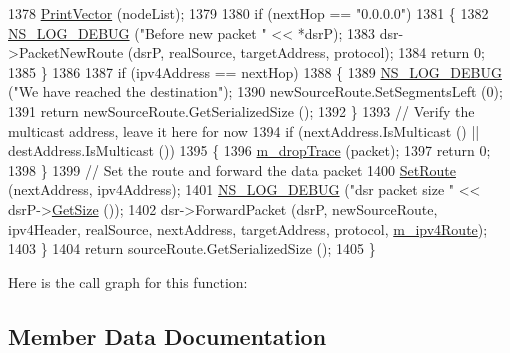 \begin{DoxyCode}
1378       \hyperlink{classns3_1_1dsr_1_1DsrOptions_a44ae8e58769880ec9c0150bb28652350}{PrintVector} (nodeList);
1379 
1380       \textcolor{keywordflow}{if} (nextHop == \textcolor{stringliteral}{"0.0.0.0"})
1381         \{
1382           \hyperlink{group__logging_ga413f1886406d49f59a6a0a89b77b4d0a}{NS\_LOG\_DEBUG} (\textcolor{stringliteral}{"Before new packet "} << *dsrP);
1383           dsr->PacketNewRoute (dsrP, realSource, targetAddress, protocol);
1384           \textcolor{keywordflow}{return} 0;
1385         \}
1386 
1387       \textcolor{keywordflow}{if} (ipv4Address == nextHop)
1388         \{
1389           \hyperlink{group__logging_ga413f1886406d49f59a6a0a89b77b4d0a}{NS\_LOG\_DEBUG} (\textcolor{stringliteral}{"We have reached the destination"});
1390           newSourceRoute.SetSegmentsLeft (0);
1391           \textcolor{keywordflow}{return} newSourceRoute.GetSerializedSize ();
1392         \}
1393       \textcolor{comment}{// Verify the multicast address, leave it here for now}
1394       \textcolor{keywordflow}{if} (nextAddress.IsMulticast () || destAddress.IsMulticast ())
1395         \{
1396           \hyperlink{classns3_1_1dsr_1_1DsrOptions_a176bbc9efb58b6d750c14b9b03c525c4}{m\_dropTrace} (packet);
1397           \textcolor{keywordflow}{return} 0;
1398         \}
1399       \textcolor{comment}{// Set the route and forward the data packet}
1400       \hyperlink{classns3_1_1dsr_1_1DsrOptions_af749b76db4626ae64bc37001a5353b99}{SetRoute} (nextAddress, ipv4Address);
1401       \hyperlink{group__logging_ga413f1886406d49f59a6a0a89b77b4d0a}{NS\_LOG\_DEBUG} (\textcolor{stringliteral}{"dsr packet size "} << dsrP->\hyperlink{classns3_1_1Packet_a462855c9929954d4301a4edfe55f4f1c}{GetSize} ());
1402       dsr->ForwardPacket (dsrP, newSourceRoute, ipv4Header, realSource, nextAddress, targetAddress, 
      protocol, \hyperlink{classns3_1_1dsr_1_1DsrOptions_ae4785209eae1d101cb8bd2d3b392d2ad}{m\_ipv4Route});
1403     \}
1404   \textcolor{keywordflow}{return} sourceRoute.GetSerializedSize ();
1405 \}
\end{DoxyCode}


Here is the call graph for this function\+:




\subsection{Member Data Documentation}
